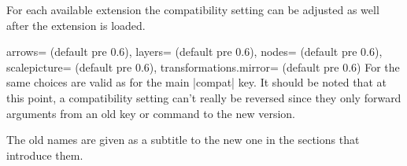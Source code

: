\begin{multicols}{2}
\newcolumn\noindent
For each available extension the compatibility setting can be adjusted as well
after the extension is loaded.
\begin{keylist}{%
  arrows= (default pre 0.6),
  layers= (default pre 0.6),
  nodes= (default pre 0.6),
  scalepicture= (default pre 0.6),
  transformations.mirror= (default pre 0.6)}
  For  the same choices are valid as for the main |compat| key.
  It should be noted that at this point, a compatibility setting can't really be reversed
  since they only forward arguments from an old key or command to the new version.
  
  The old names are given as a subtitle to the new one in the sections that introduce them.
\end{keylist}
\end{multicols}